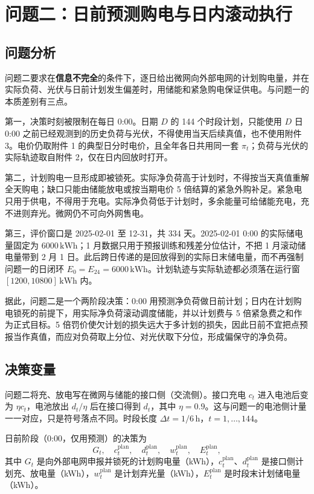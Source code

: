 \section{问题二：日前预测购电与日内滚动执行}

\subsection{问题分析}

问题二要求在\textbf{信息不完全}的条件下，逐日给出微网向外部电网的计划购电量，并在实际负荷、光伏与日前计划发生偏差时，用储能和紧急购电保证供电。与问题一的本质差别有三点。

第一，决策时刻被限制在每日 0:00。日期 \(D\) 的 144 个时段计划，只能使用 \(D\) 日 0:00 之前已经观测到的历史负荷与光伏，不得使用当天后续真值，也不使用附件 3。电价仍取附件 1 的典型日分时电价，且全年各日共用同一套 \(\pi_t\)；负荷与光伏的实际轨迹取自附件 2，仅在日内回放时打开。

第二，计划购电一旦形成即被锁死。实际净负荷高于计划时，不得按当天真值重解全天购电；缺口只能由储能放电或按当期电价 5 倍结算的紧急外购补足。紧急电只用于供电，不得用于充电。实际净负荷低于计划时，多余能量可给储能充电，充不进则弃光。微网仍不可向外网售电。

第三，评价窗口是 2025-02-01 至 12-31，共 334 天。2025-02-01 0:00 的实际储电量固定为 \(6000\,\mathrm{kWh}\)；1 月数据只用于预报训练和残差分位估计，不把 1 月滚动储电量带到 2 月 1 日。此后跨日传递的是回放得到的实际日末储电量，而不再强制问题一的日闭环 \(E_0=E_{24}=6000\,\mathrm{kWh}\)。计划轨迹与实际轨迹都必须落在运行窗 \([1200,10800]\,\mathrm{kWh}\) 内。

据此，问题二是一个两阶段决策：0:00 用预测净负荷做日前计划；日内在计划购电锁死的前提下，用实际净负荷滚动调度储能，并以计划费与 5 倍紧急费之和作为正式目标。5 倍罚价使欠计划的损失远大于多计划的损失，因此日前不宜把点预报当作真值，而应对负荷取上分位、对光伏取下分位，形成偏保守的净负荷。

\subsection{决策变量}

问题二将充、放电写在微网与储能的接口侧（交流侧）。接口充电 \(c_t\) 进入电池后变为 \(\eta c_t\)，电池放出 \(d_t/\eta\) 后在接口得到 \(d_t\)，其中 \(\eta=0.9\)。这与问题一的电池侧计量一一对应，只是符号落点不同。时段长度 \(\Delta t=1/6\,\mathrm{h}\)，\(t=1,\ldots,144\)。

日前阶段（0:00，仅用预测）的决策为
\[
G_t,\quad
c_t^{\mathrm{plan}},\quad
d_t^{\mathrm{plan}},\quad
w_t^{\mathrm{plan}},\quad
E_t^{\mathrm{plan}},
\]
其中 \(G_t\) 是向外部电网申报并锁死的计划购电量（kWh），\(c_t^{\mathrm{plan}}\)、\(d_t^{\mathrm{plan}}\) 是接口侧计划充、放电量（kWh），\(w_t^{\mathrm{plan}}\) 是计划弃光量（kWh），\(E_t^{\mathrm{plan}}\) 是时段末计划储电量（kWh）。

